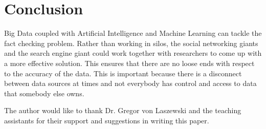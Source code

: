 \documentclass[sigconf]{acmart}
\begin{document}
\section{Conclusion}

Big Data coupled with Artificial Intelligence and Machine Learning can tackle the fact checking problem. Rather than working in silos, the social networking giants and the search engine giant could work together with researchers to come up with a more effective solution. This ensures that there are no loose ends with respect to the accuracy of the data. This is important because there is a disconnect between data sources at times and not everybody has control and access to data that somebody else owns.
    
\begin{acks}

The author would like to thank Dr. Gregor von Laszewski and the teaching assistants for their support and suggestions in writing this paper.

\end{acks}


 
\end{document}
